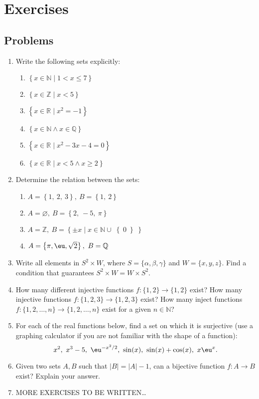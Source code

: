 \section{Exercises}
\subsection{Problems}
\begin{enumerate}
  \item Write the following sets explicitly:
    \begin{enumerate}[label=(\roman*)]
      \item $\left\{ x\in \mathbb{N}\mid1<x\leq7\right\}$
      \item $\left\{ x\in \mathbb{Z}\mid x<5\right\}$
      \item $\left\{ x\in \mathbb{R}\mid x^{2}=-1 \right\}$
      \item $\left\{ x\in \mathbb{N}\wedge x\in \mathbb{Q} \right\}$
      \item $\left\{ x\in \mathbb{R}\mid x^{2}-3x-4=0 \right\}$
      \item $\left\{ x\in\mathbb{R}\mid x<5\wedge x \geq 2\right\}$
    \end{enumerate}
  
	\item Determine the relation between the sets:
    \begin{enumerate}[label=(\roman*)]
      \item $A=\left\{ 1,\ 2,\ 3\right\},\ B=\left\{ 1,\ 2 \right\}$
      \item $A=\varnothing,\ B=\left\{ 2,\ -5,\ \pi \right\}$
      \item $A=\mathbb{Z},\ B=\left\{ \pm x \mid x\in\mathbb{N} \cup \right\{0\left\} \right\}$
			\item $A=\left\{\pi, \eu, \sqrt{2}\right\},\ B=\mathbb{Q}$
    \end{enumerate}

	\item Write all elements in $S^{2}\times W$, where $S=\{\alpha,\beta,\gamma\}$ and $W=\{x,y,z\}$. Find a condition that guarantees $S^{2}\times W = W\times S^{2}$.

	\item How many different injective functions $f:\{1,2\}\to\{1,2\}$ exist? How many injective functions $f:\{1,2,3\}\to\{1,2,3\}$ exist? How many inject functions $f:\{1,2,\dots,n\}\to\{1,2,\dots,n\}$ exist for a given $n\in\mathbb{N}$?

	\item For each of the real functions below, find a set on which it is surjective (use a graphing calculator if you are not familiar with the shape of a function):
		\[
			x^{2},\ x^{3}-5,\ \eu^{-x^{2}/2},\ \sin(x),\ \sin(x)+\cos(x),\ x\eu^{x}.
		\]

	\item Given two sets $A,B$ such that $|B|=|A|-1$, can a bijective function $f:A\to B$ exist? Explain your answer.
	\item MORE EXERCISES TO BE WRITTEN\ldots
\end{enumerate}

